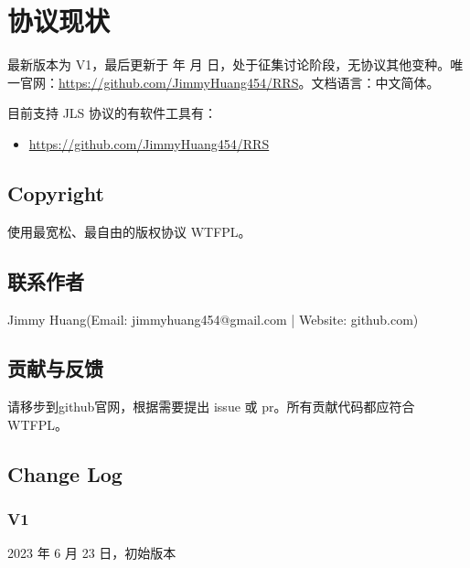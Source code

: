 \renewcommand{\today}{\number\year 年 \number\month 月 \number\day 日}

\chapter{协议现状}

最新版本为 V1，最后更新于 \today，处于征集讨论阶段，无协议其他变种。唯一官网：\href{https://github.com/JimmyHuang454/RRS}{https://github.com/JimmyHuang454/RRS}。文档语言：中文简体。

目前支持 JLS 协议的有软件工具有：
\begin{itemize}
	\item \href{https://github.com/JimmyHuang454/RRS}{https://github.com/JimmyHuang454/RRS}
\end{itemize}



\section{Copyright}
使用最宽松、最自由的版权协议 WTFPL。

\section{联系作者}
Jimmy Huang(Email: jimmyhuang454@gmail.com | Website: github.com)


\section{贡献与反馈}
请移步到github官网，根据需要提出 issue 或 pr。所有贡献代码都应符合 WTFPL。

\section{Change Log}
\subsection{V1}
2023 年 6 月 23 日，初始版本
